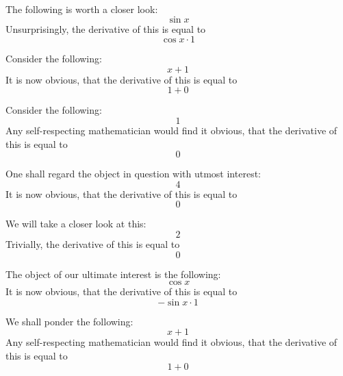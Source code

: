 \documentclass{article}
\begin{document}
The following is worth a closer look:
\begin{equation}
\sin x 
\end{equation}
Unsurprisingly, the derivative of this is equal to
\begin{equation}
\cos x \cdot 1 
\end{equation}

Consider the following:
\begin{equation}
x + 1 
\end{equation}
It is now obvious, that the derivative of this is equal to
\begin{equation}
1 + 0 
\end{equation}

Consider the following:
\begin{equation}
1 
\end{equation}
Any self-respecting mathematician would find it obvious, that the derivative of this is equal to
\begin{equation}
0 
\end{equation}

One shall regard the object in question with utmost interest:
\begin{equation}
4 
\end{equation}
It is now obvious, that the derivative of this is equal to
\begin{equation}
0 
\end{equation}

We will take a closer look at this:
\begin{equation}
2 
\end{equation}
Trivially, the derivative of this is equal to
\begin{equation}
0 
\end{equation}

The object of our ultimate interest is the following:
\begin{equation}
\cos x 
\end{equation}
It is now obvious, that the derivative of this is equal to
\begin{equation}
-\sin x \cdot 1 
\end{equation}

We shall ponder the following:
\begin{equation}
x + 1 
\end{equation}
Any self-respecting mathematician would find it obvious, that the derivative of this is equal to
\begin{equation}
1 + 0 
\end{equation}
\end{document}
